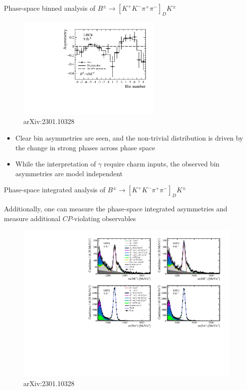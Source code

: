\documentclass{beamer}
\begin{document}
\begin{frame}{Phase-space binned analysis of $B^\pm\to[K^+K^-\pi^+\pi^-]_DK^\pm$}
  \begin{figure}
    \includegraphics[height = 5cm]{Plots/BinAsymmetries_dk.pdf}
    \caption*{\tiny arXiv:2301.10328}
  \end{figure}
  \vspace{-0.4cm}
  \begin{itemize}
    \setlength\itemsep{0.5em}
    \item{Clear bin asymmetries are seen, and the non-trivial distribution is driven by the change in strong phases across phase space}
    \item{While the interpretation of $\gamma$ require charm inputs, the observed bin asymmetries are model independent}
  \end{itemize}
\end{frame}

\begin{frame}{Phase-space integrated analysis of $B^\pm\to[K^+K^-\pi^+\pi^-]_DK^\pm$}
  \begin{center}
    {\large Additionally, one can measure the phase-space integrated asymmetries and measure additional $C\!P$-violating observables}
  \end{center}
  \begin{figure}
    \centering
    \includegraphics[width = 1.0\textwidth,trim={0 7cm 0 0},clip=true]{Plots/d2kkpipi_fiveL_allDP_GLW.pdf}
    \caption*{\tiny arXiv:2301.10328}
  \end{figure}
\end{frame}
\end{document}
